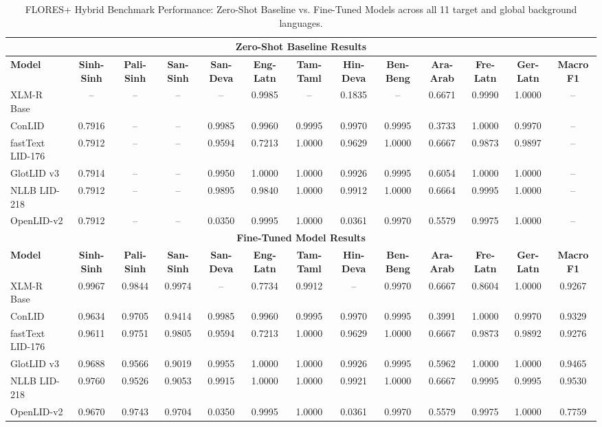 \documentclass[11pt]{article}
\begin{document}
\begin{table}[p]
\centering
\scriptsize
\setlength{\tabcolsep}{2.2pt}
\renewcommand{\arraystretch}{0.90}
\caption{FLORES+ Hybrid Benchmark Performance: Zero-Shot Baseline vs. Fine-Tuned Models across all 11 target and global background languages.}
\label{tab:flores_full}
\begin{tabular}{l ccc cccccccc c}
\toprule
\multicolumn{13}{c}{\textbf{Zero-Shot Baseline Results}} \\
\midrule
\textbf{Model} & \textbf{Sinh-Sinh} & \textbf{Pali-Sinh} & \textbf{San-Sinh} & \textbf{San-Deva} & \textbf{Eng-Latn} & \textbf{Tam-Taml} & \textbf{Hin-Deva} & \textbf{Ben-Beng} & \textbf{Ara-Arab} & \textbf{Fre-Latn} & \textbf{Ger-Latn} & \textbf{Macro F1} \\
\midrule
XLM-R Base & -- & -- & -- & -- & 0.9985 & -- & 0.1835 & -- & 0.6671 & 0.9990 & 1.0000 & -- \\
ConLID & 0.7916 & -- & -- & 0.9985 & 0.9960 & 0.9995 & 0.9970 & 0.9995 & 0.3733 & 1.0000 & 0.9970 & -- \\
fastText LID-176 & 0.7912 & -- & -- & 0.9594 & 0.7213 & 1.0000 & 0.9629 & 1.0000 & 0.6667 & 0.9873 & 0.9897 & -- \\
GlotLID v3 & 0.7914 & -- & -- & 0.9950 & 1.0000 & 1.0000 & 0.9926 & 0.9995 & 0.6054 & 1.0000 & 1.0000 & -- \\
NLLB LID-218 & 0.7912 & -- & -- & 0.9895 & 0.9840 & 1.0000 & 0.9912 & 1.0000 & 0.6664 & 0.9995 & 1.0000 & -- \\
OpenLID-v2 & 0.7912 & -- & -- & 0.0350 & 0.9995 & 1.0000 & 0.0361 & 0.9970 & 0.5579 & 0.9975 & 1.0000 & -- \\
\midrule
\multicolumn{13}{c}{\textbf{Fine-Tuned Model Results}} \\
\midrule
\textbf{Model} & \textbf{Sinh-Sinh} & \textbf{Pali-Sinh} & \textbf{San-Sinh} & \textbf{San-Deva} & \textbf{Eng-Latn} & \textbf{Tam-Taml} & \textbf{Hin-Deva} & \textbf{Ben-Beng} & \textbf{Ara-Arab} & \textbf{Fre-Latn} & \textbf{Ger-Latn} & \textbf{Macro F1} \\
\midrule
XLM-R Base & 0.9967 & 0.9844 & 0.9974 & -- & 0.7734 & 0.9912 & -- & 0.9970 & 0.6667 & 0.8604 & 1.0000 & 0.9267 \\
ConLID & 0.9634 & 0.9705 & 0.9414 & 0.9985 & 0.9960 & 0.9995 & 0.9970 & 0.9995 & 0.3991 & 1.0000 & 0.9970 & 0.9329 \\
fastText LID-176 & 0.9611 & 0.9751 & 0.9805 & 0.9594 & 0.7213 & 1.0000 & 0.9629 & 1.0000 & 0.6667 & 0.9873 & 0.9892 & 0.9276 \\
GlotLID v3 & 0.9688 & 0.9566 & 0.9019 & 0.9955 & 1.0000 & 1.0000 & 0.9926 & 0.9995 & 0.5962 & 1.0000 & 1.0000 & 0.9465 \\
NLLB LID-218 & 0.9760 & 0.9526 & 0.9053 & 0.9915 & 1.0000 & 1.0000 & 0.9921 & 1.0000 & 0.6667 & 0.9995 & 0.9995 & 0.9530 \\
OpenLID-v2 & 0.9670 & 0.9743 & 0.9704 & 0.0350 & 0.9995 & 1.0000 & 0.0361 & 0.9970 & 0.5579 & 0.9975 & 1.0000 & 0.7759 \\
\bottomrule
\end{tabular}


\end{table}
\end{document}
